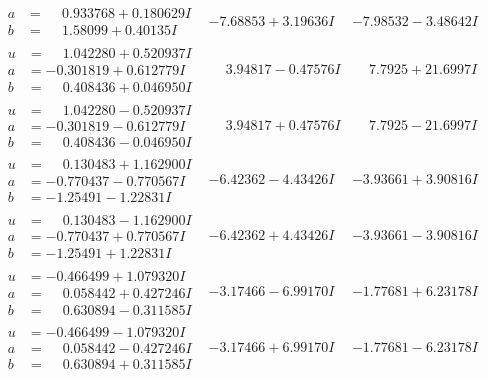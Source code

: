 \documentclass[1p]{elsarticle_modified}
\theoremstyle{definition}
\begin{document}
$$\begin{array}{c|c|c}
\begin{aligned}
a &= \phantom{-}0.933768 + 0.180629 I \\
b &= \phantom{-}1.58099 + 0.40135 I\end{aligned}
 & -7.68853 + 3.19636 I & -7.98532 - 3.48642 I \\ \hline\begin{aligned}
u &= \phantom{-}1.042280 + 0.520937 I \\
a &= -0.301819 + 0.612779 I \\
b &= \phantom{-}0.408436 + 0.046950 I\end{aligned}
 & \phantom{-}3.94817 - 0.47576 I & \phantom{-}7.7925 + 21.6997 I \\ \hline\begin{aligned}
u &= \phantom{-}1.042280 - 0.520937 I \\
a &= -0.301819 - 0.612779 I \\
b &= \phantom{-}0.408436 - 0.046950 I\end{aligned}
 & \phantom{-}3.94817 + 0.47576 I & \phantom{-}7.7925 - 21.6997 I \\ \hline\begin{aligned}
u &= \phantom{-}0.130483 + 1.162900 I \\
a &= -0.770437 - 0.770567 I \\
b &= -1.25491 - 1.22831 I\end{aligned}
 & -6.42362 - 4.43426 I & -3.93661 + 3.90816 I \\ \hline\begin{aligned}
u &= \phantom{-}0.130483 - 1.162900 I \\
a &= -0.770437 + 0.770567 I \\
b &= -1.25491 + 1.22831 I\end{aligned}
 & -6.42362 + 4.43426 I & -3.93661 - 3.90816 I \\ \hline\begin{aligned}
u &= -0.466499 + 1.079320 I \\
a &= \phantom{-}0.058442 + 0.427246 I \\
b &= \phantom{-}0.630894 - 0.311585 I\end{aligned}
 & -3.17466 - 6.99170 I & -1.77681 + 6.23178 I \\ \hline\begin{aligned}
u &= -0.466499 - 1.079320 I \\
a &= \phantom{-}0.058442 - 0.427246 I \\
b &= \phantom{-}0.630894 + 0.311585 I\end{aligned}
 & -3.17466 + 6.99170 I & -1.77681 - 6.23178 I \\ \hline\begin{aligned}

\end{aligned}
\end{array}$$
\end{document}
